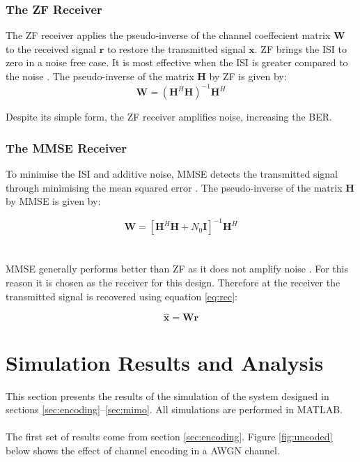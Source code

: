 \documentclass[11pt]{report}
\renewcommand{\vec}[1]{\mathbf{#1}} %
\begin{document}
\subsubsection{The ZF Receiver}
\label{subsub:zf}
The ZF receiver applies the pseudo-inverse of the channel coeffecient matrix $\vec{W}$ to the received signal $\vec{r}$ to restore the transmitted signal $\vec{x}$. ZF brings the ISI to zero in a noise free case. It is most effective when the ISI is greater compared to the noise \cite{46}. The pseudo-inverse of the matrix $\vec{H}$  by ZF is given by:
\begin{equation}
\label{eq:zf}
\vec{W} = (\vec{H}^H\vec{H})^{-1}\vec{H}^H
\end{equation}

Despite its simple form, the ZF receiver amplifies noise, increasing the BER.

\subsubsection{The MMSE Receiver}
To minimise the ISI and additive noise, MMSE detects the transmitted signal through minimising the mean squared error \cite{B9}. The pseudo-inverse of the matrix $\vec{H}$ by MMSE is given by:

\begin{equation}
\label{eq:mmse}
\vec{W} = [\vec{H}^H\vec{H} + N_0\vec{I}]^{-1}\vec{H}^H
\end{equation}
\\
\\
MMSE generally performs better than ZF as it does not amplify noise \cite{46}. For this reason it is chosen as the receiver for this design. Therefore at the receiver the transmitted signal is recovered using equation \ref{eq:rec}:

\begin{equation}
	\label{eq:rec}
	\vec{\hat{x}} = \vec{W}\vec{r}
\end{equation}

\section{Simulation Results and Analysis}
\label{sec:results}
This section presents the results of the simulation of the system designed in sections \ref{sec:encoding}--\ref{sec:mimo}. All simulations are performed in MATLAB.
\\
\\
The first set of results come from section \ref{sec:encoding}. Figure \ref{fig:uncoded} below shows the effect of channel encoding in a AWGN channel.
\end{document}
